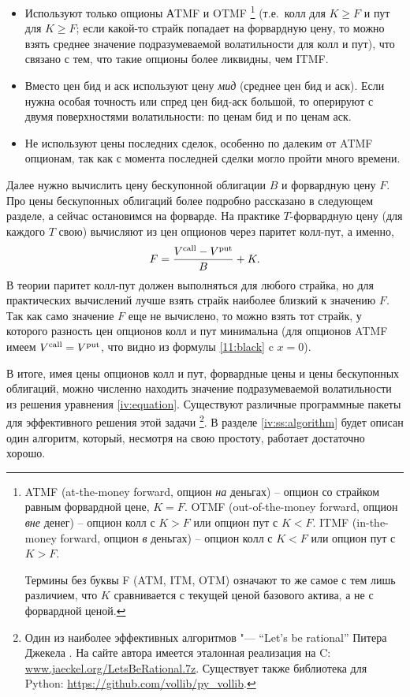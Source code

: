 \begin{itemize}
\item Используют только опционы АTMF и OTMF%
\footnote{
ATMF (at-the-money forward, опцион \emph{на} деньгах) -- опцион со страйком равным форвардной цене, $K=F$.
OTMF (out-of-the-money forward, опцион \emph{вне} денег) -- опцион колл с $K>F$ или опцион пут с $K<F$.
ITMF (in-the-money forward, опцион \emph{в} деньгах) -- опцион колл с $K<F$ или опцион пут с $K>F$.
 
Термины без буквы F (ATM, ITM, OTM) означают то же самое с тем лишь различием, что $K$ сравнивается с текущей ценой базового актива, а не с форвардной ценой.} (т.е.\ колл для $K\ge F$ и пут для $K\ge F$; если какой-то страйк попадает на форвардную цену, то можно взять среднее значение подразумеваемой волатильности для колл и пут), что связано с тем, что такие опционы более ликвидны, чем ITMF. 

\item Вместо цен бид и аск используют цену \emph{мид} (среднее цен бид и аск).
Если нужна особая точность или спред цен бид-аск большой, то оперируют с двумя поверхностями волатильности: по ценам бид и по ценам аск.

\item Не используют цены последних сделок, особенно по далеким от ATMF опционам, так как с момента последней сделки могло пройти много времени.
\end{itemize}



Далее нужно вычислить цену бескупонной облигации $B$ и форвардную цену $F$.
Про цены бескупонных облигаций более подробно рассказано в следующем разделе, а сейчас остановимся на форварде.
На практике $T$-форвардную цену (для каждого $T$ свою) вычисляют из цен опционов через паритет колл-пут, а именно,
\[
F = \frac{V^{\text{\normalfont call}} - V^{\text{\normalfont put}}}{B} + K.
\]
В теории паритет колл-пут должен выполняться для любого страйка, но для практических вычислений лучше взять страйк наиболее близкий к значению $F$.
Так как само значение $F$ еще не вычислено, то можно взять тот страйк, у которого разность цен опционов колл и пут минимальна (для опционов ATMF имеем $V^{\text{\normalfont call}}=V^{\text{\normalfont put}}$, что видно из формулы \eqref{11:black} c $x=0$).

\medskip
В итоге, имея цены опционов колл и пут, форвардные цены и цены бескупонных облигаций, можно численно находить значение подразумеваемой волатильности из решения уравнения \eqref{iv:equation}.
Существуют различные программные пакеты для эффективного решения этой задачи%
\footnote{Один из наиболее эффективных алгоритмов "--- ``Let's be rational'' Питера Джекела \cite{Jaeckel15}.
На сайте автора имеется эталонная реализация на C: \url{www.jaeckel.org/LetsBeRational.7z}.
Существует также библиотека для Python: \url{https://github.com/vollib/py_vollib}.}.
В разделе \ref{iv:ss:algorithm} будет описан один алгоритм, который, несмотря на свою простоту, работает достаточно хорошо.

